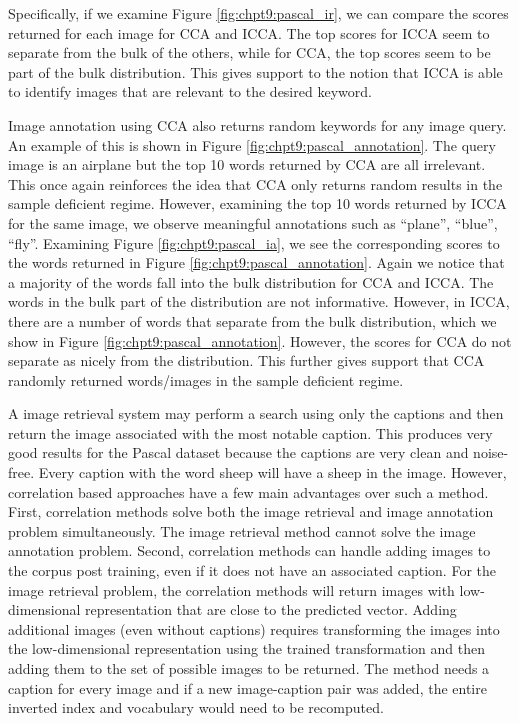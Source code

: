 Specifically, if we examine Figure \ref{fig:chpt9:pascal_ir}, we can compare the scores
returned for each image for CCA and ICCA. The top scores for ICCA seem to separate from
the bulk of the others, while for CCA, the top scores seem to be part of the bulk
distribution. This gives support to the notion that ICCA is able to identify images that
are relevant to the desired keyword.

Image annotation using CCA also returns random keywords for any image query. An example of
this is shown in Figure \ref{fig:chpt9:pascal_annotation}. The query image is an airplane but
the top 10 words returned by CCA are all irrelevant. This once again reinforces the idea
that CCA only returns random results in the sample deficient regime. However, examining
the top 10 words returned by ICCA for the same image, we observe meaningful annotations
such as ``plane'', ``blue'', ``fly''. Examining Figure \ref{fig:chpt9:pascal_ia}, we see the
corresponding scores to the words returned in Figure
\ref{fig:chpt9:pascal_annotation}. Again we notice that a majority of the words fall into
the bulk distribution for CCA and ICCA. The words in the bulk part of the distribution are
not informative. However, in ICCA, there are a number of words that separate from the bulk
distribution, which we show in Figure \ref{fig:chpt9:pascal_annotation}. However, the
scores for CCA do not separate as nicely from the distribution. This further gives support
that CCA randomly returned words/images in the sample deficient regime.

A \naive image retrieval system may perform a search using only the captions and then
return the image associated with the most notable caption. This produces very good results
for the Pascal dataset because the captions are very clean and noise-free. Every caption
with the word sheep will have a sheep in the image. However, correlation based approaches
have a few main advantages over such a \naive method. First, correlation methods solve
both the image retrieval and image annotation problem simultaneously. The \naive image
retrieval method cannot solve the image annotation problem. Second, correlation methods
can handle adding images to the corpus post training, even if it does not have an
associated caption. For the image retrieval problem, the correlation methods will return
images with low-dimensional representation that are close to the predicted vector. Adding
additional images (even without captions) requires transforming the images into the
low-dimensional representation using the trained transformation and then adding them to
the set of possible images to be returned. The \naive method needs a caption for every
image and if a new image-caption pair was added, the entire inverted index and vocabulary
would need to be recomputed.


